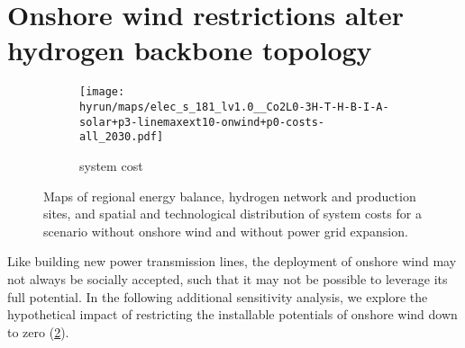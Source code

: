 
\section*{Onshore wind restrictions alter hydrogen backbone topology}
\label{sec:onwind}

\begin{figure}
    \centering
    \begin{subfigure}[t]{0.6\textwidth}
        \centering
        \caption{system cost}
        \texttt{[image: \\hyrun/maps/elec\_s\_181\_lv1.0\_\_Co2L0-3H-T-H-B-I-A-solar+p3-linemaxext10-onwind+p0-costs-all\_2030.pdf]}
        \label{fig:no-onw:tsc}
    \end{subfigure}
    \caption{Maps of regional energy balance, hydrogen network and production sites, and spatial and technological distribution of system costs for a scenario without onshore wind and without power grid expansion.}
    \label{fig:no-onw}
\end{figure}


Like building new power transmission lines, the deployment of onshore wind may
not always be socially accepted, such that it may not be possible to leverage
its full potential. In the following additional sensitivity analysis, we explore
the hypothetical impact of restricting the installable potentials of onshore
wind down to zero (\cref{fig:no-onw}).

